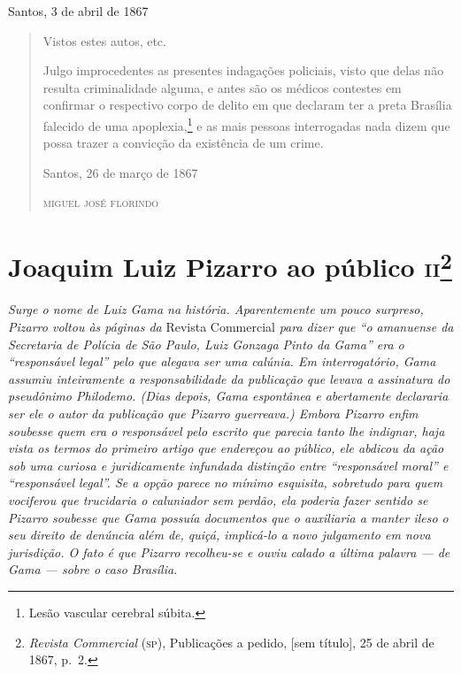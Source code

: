 \begin{flushright}
Santos, 3 de abril de 1867
\end{flushright}

\begin{quote}
Vistos estes autos, etc.

Julgo improcedentes as presentes indagações policiais, visto que delas
não resulta criminalidade alguma, e antes são os médicos contestes em
confirmar o respectivo corpo de delito em que declaram ter a preta
Brasília falecido de uma apoplexia,\footnote{ Lesão vascular cerebral
  súbita.} e as mais pessoas interrogadas nada dizem que possa trazer a
convicção da existência de um crime.

\begin{flushright}
Santos, 26 de março de 1867

\textsc{miguel josé florindo}
\end{flushright}
\end{quote}

\chapter{Joaquim Luiz Pizarro ao público \textsc{ii}\footnote{\emph{Revista Commercial} (\textsc{sp}), Publicações a pedido, {[}sem título{]}, 25 de abril de 1867, p.~2.}}

\begin{didascalia}
\emph{Surge o nome de Luiz Gama na história. Aparentemente um pouco
surpreso, Pizarro voltou às páginas da} Revista Commercial \emph{para
dizer que ``o amanuense da Secretaria de Polícia de São Paulo, Luiz
Gonzaga Pinto da Gama'' era o ``responsável legal'' pelo que alegava ser
uma calúnia. Em interrogatório, Gama assumiu inteiramente a
responsabilidade da publicação que levava a assinatura do pseudônimo
Philodemo. (Dias depois, Gama espontânea e abertamente declararia ser
ele o autor da publicação que Pizarro guerreava.) Embora
Pizarro enfim soubesse quem era o responsável pelo escrito que parecia
tanto lhe indignar, haja vista os termos do primeiro artigo que
endereçou ao público, ele abdicou da ação sob uma curiosa e
juridicamente infundada distinção entre ``responsável moral'' e
``responsável legal''. Se a opção parece no mínimo esquisita, sobretudo
para quem vociferou que trucidaria o caluniador sem perdão, ela poderia
fazer sentido se Pizarro soubesse que Gama possuía documentos que o
auxiliaria a manter ileso o seu direito de denúncia além de, quiçá,
implicá-lo a novo julgamento em nova jurisdição. O fato é que Pizarro
recolheu-se e ouviu calado a última palavra --- de Gama --- sobre o caso
Brasília.}
\end{didascalia}



